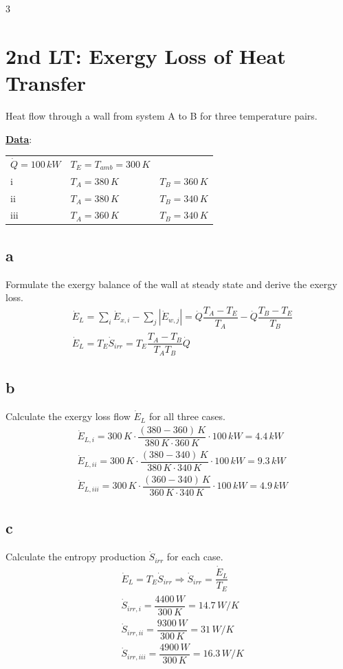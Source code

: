 \documentclass[9pt, landscape, a4paper]{article}
\begin{document}
\begin{multicols*}{3}
\section{2nd LT: Exergy Loss of Heat Transfer}
Heat flow through a wall from system A to B for three temperature pairs.

\textbf{\underline{Data}}:
\begin{center}
\setlength{\tabcolsep}{3pt}
\renewcommand{\arraystretch}{1.2}
\begin{tabular}{@{}lll@{}}
  $\dot Q=100\,kW$ & $T_E=T_{amb}=300\,K$ & \\
  i & $T_A=380\,K$ & $T_B=360\,K$\\
  ii & $T_A=380\,K$ & $T_B=340\,K$\\
  iii & $T_A=360\,K$ & $T_B=340\,K$
\end{tabular}
\end{center}
\renewcommand{\arraystretch}{1}

\subsection*{a}
Formulate the exergy balance of the wall at steady state and derive the exergy
loss.
\begingroup
\scriptsize
\begin{align*}
  & \dot E_L=\sum_i\dot E_{x,i}-\sum_j\left|\dot E_{w,j}\right|
  =\dot Q\dfrac{T_A-T_E}{T_A}
  -\dot Q\dfrac{T_B-T_E}{T_B}\\[.8ex]
  & \boxed{\dot E_L
  =T_E\dot S_{irr}
  =T_E\dfrac{T_A-T_B}{T_AT_B}\dot Q}
\end{align*}
\endgroup

\subsection*{b}
Calculate the exergy loss flow $\dot E_L$ for all three cases.
\begingroup
\scriptsize
\begin{align*}
  & \dot E_{L,i}
  =300\,K\cdot\dfrac{(380-360)\,K}{380\,K\cdot360\,K}\cdot100\,kW
  =4.4\,kW\\[.8ex]
  & \dot E_{L,ii}
  =300\,K\cdot\dfrac{(380-340)\,K}{380\,K\cdot340\,K}\cdot100\,kW
  =9.3\,kW\\[.8ex]
  & \dot E_{L,iii}
  =300\,K\cdot\dfrac{(360-340)\,K}{360\,K\cdot340\,K}\cdot100\,kW
  =4.9\,kW
\end{align*}
\endgroup

\subsection*{c}
Calculate the entropy production $\dot S_{irr}$ for each case.
\begingroup
\scriptsize
\begin{align*}
  & \dot E_L=T_E\dot S_{irr}
  \Longrightarrow \dot S_{irr}=\dfrac{\dot E_L}{T_E}\\[.8ex]
  & \dot S_{irr,i}=\dfrac{4400\,W}{300\,K}=14.7\,W/K\\[.8ex]
  & \dot S_{irr,ii}=\dfrac{9300\,W}{300\,K}=31\,W/K\\[.8ex]
  & \dot S_{irr,iii}=\dfrac{4900\,W}{300\,K}=16.3\,W/K
\end{align*}
\endgroup


\end{multicols*}
\end{document}
